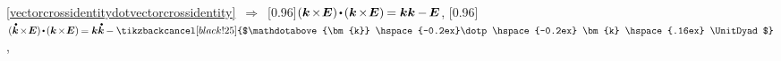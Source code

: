 \begin{otherlanguage}{russian}
\vspace{-0.4em} \noindent \eqref{vectorcrossidentitydotvectorcrossidentity} $\,\Rightarrow\,$
\scalebox{0.95}[0.96]{${( \bm{k} \hspace{-0.24ex}\times\hspace{-0.4ex} \UnitDyad ) \hspace{-0.2ex} \dotp \hspace{-0.2ex} ( \bm{k} \hspace{-0.24ex}\times\hspace{-0.4ex} \UnitDyad ) \hspace{-0.16ex} = \bm{k} \bm{k} \hspace{-0.1ex} - \hspace{-0.2ex} \UnitDyad}$},\hspace{0.4ex}
%
\scalebox{0.95}[0.96]{${\displaystyle ( \mathdotabove{\bm{k}} \hspace{-0.24ex}\times\hspace{-0.4ex} \UnitDyad ) \hspace{-0.2ex} \dotp \hspace{-0.2ex} ( \bm{k} \hspace{-0.24ex}\times\hspace{-0.4ex} \UnitDyad ) \hspace{-0.16ex} = \bm{k} \mathdotabove{\bm{k}} \hspace{-0.1ex} - \tikzbackcancel[black!25]{$\mathdotabove{\bm{k}} \hspace{-0.2ex}\dotp\hspace{-0.2ex} \bm{k} \hspace{.16ex} \UnitDyad$}}$\hspace{.16ex}},


\end{otherlanguage}
